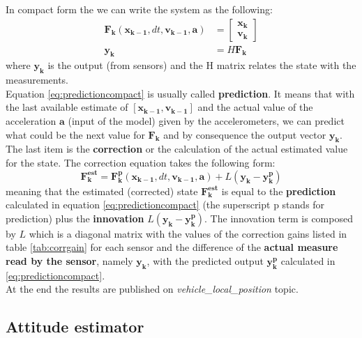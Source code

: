 \noindent
In compact form the we can write the system as the following:
\begin{equation}
	\begin{aligned}
	\boldsymbol{F_k}(\boldsymbol{x_{k-1}}, dt ,\boldsymbol{v_{k-1}}, \boldsymbol{a})& = \begin{bmatrix}\boldsymbol{x_k}\\\boldsymbol{v_k}\end{bmatrix}\\
	\boldsymbol{y_k}& = H \boldsymbol{F_k}
	\end{aligned}
	\label{eq:predictioncompact}
	\end{equation}
where $\boldsymbol{y_k}$ is the output  (from sensors) and the H matrix relates the state with the measurements. \\

\noindent
Equation \ref{eq:predictioncompact} is usually called \textbf{prediction}. It means that with the last available estimate of  $[\boldsymbol{x_{k-1}},\boldsymbol{v_{k-1}}]$ and the actual value of the acceleration $\boldsymbol{a}$ (input of the model) given by the accelerometers, we can predict what could be the next value for $\boldsymbol{F_k}$ and by consequence the output vector $\boldsymbol{y_k}$. \\

\noindent
The last item is the \textbf{correction} or the calculation of the actual estimated value for the state. The correction equation takes the following form:
\begin{equation}
	\boldsymbol{F_k^{est}} = \boldsymbol{F_k^p}(\boldsymbol{x_{k-1}}, dt ,\boldsymbol{v_{k-1}}, \boldsymbol{a}) + L(\boldsymbol{y_k} - \boldsymbol{y_k^p})
	\label{eq:observer}
\end{equation}
meaning that the estimated (corrected) state $\boldsymbol{F_k^{est}}$ is equal to the \textbf{prediction} calculated in equation \ref{eq:predictioncompact} (the superscript p stands for prediction) plus the \textbf{innovation} $L(\boldsymbol{y_k} - \boldsymbol{y_k^p})$. The innovation term is composed by $L$ which is a diagonal matrix with the values of the correction gains listed in table \ref{tab:corrgain} for each sensor and the difference of the \textbf{actual measure read by the sensor}, namely $\boldsymbol{y_k}$, with the predicted output $\boldsymbol{y_k^p}$ calculated in \ref{eq:predictioncompact}. \\

\noindent
At the end the results are  published on \textit{vehicle\_local\_position} topic.

\subsection{Attitude estimator}










